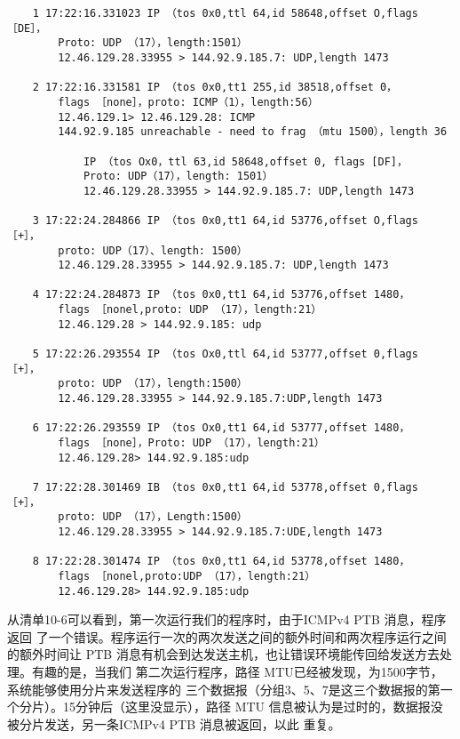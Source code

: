 \begin{verbatim}
    1 17:22:16.331023 IP （tos 0x0,ttl 64,id 58648,offset O,flags ［DE］，
        Proto: UDP （17），length:1501）
        12.46.129.28.33955 > 144.92.9.185.7: UDP,length 1473
    
    2 17:22:16.331581 IP （tos 0x0,tt1 255,id 38518,offset 0，
        flags ［none］，proto: ICMP（1），length:56）
        12.46.129.1> 12.46.129.28: ICMP
        144.92.9.185 unreachable - need to frag （mtu 1500），length 36
    
            IP （tos Ox0，ttl 63,id 58648,offset 0, flags [DF]，
            Proto: UDP（17），length: 1501）
            12.46.129.28.33955 > 144.92.9.185.7: UDP,length 1473
    
    3 17:22:24.284866 IP （tos 0x0,tt1 64,id 53776,offset O,flags ［+］，
        proto: UDP（17）、length: 1500）
        12.46.129.28.33955 > 144.92.9.185.7: UDP,length 1473
    
    4 17:22:24.284873 IP （tos 0x0,tt1 64,id 53776,offset 1480，
        flags ［nonel,proto: UDP （17），length:21）
        12.46.129.28 > 144.92.9.185: udp
    
    5 17:22:26.293554 IP （tos Ox0,ttl 64,id 53777,offset 0,flags ［+］，
        proto: UDP （17），length:1500）
        12.46.129.28.33955 > 144.92.9.185.7:UDP,length 1473
    
    6 17:22:26.293559 IP （tos Ox0,tt1 64,id 53777,offset 1480，
        flags ［none］，Proto: UDP （17），length:21）
        12.46.129.28> 144.92.9.185:udp
    
    7 17:22:28.301469 IB （tos 0x0,tt1 64,id 53778,offset 0,flags ［+］，
        proto: UDP （17），Length:1500）
        12.46.129.28.33955 > 144.92.9.185.7:UDE,length 1473
    
    8 17:22:28.301474 IP （tos 0x0,tt1 64,id 53778,offset 1480，
        flags ［nonel,proto:UDP （17），length:21）
        12.46.129.28> 144.92.9.185:udp
\end{verbatim}

从清单10-6可以看到，第一次运行我们的程序时，由于ICMPv4 PTB 消息，程序返回
了一个错误。程序运行一次的两次发送之间的额外时间和两次程序运行之间的额外时间让
PTB 消息有机会到达发送主机，也让错误环境能传回给发送方去处理。有趣的是，当我们
第二次运行程序，路径 MTU已经被发现，为1500字节，系统能够使用分片来发送程序的
三个数据报（分组3、5、7是这三个数据报的第一个分片）。15分钟后（这里没显示），路径
MTU 信息被认为是过时的，数据报没被分片发送，另一条ICMPv4 PTB 消息被返回，以此
重复。


